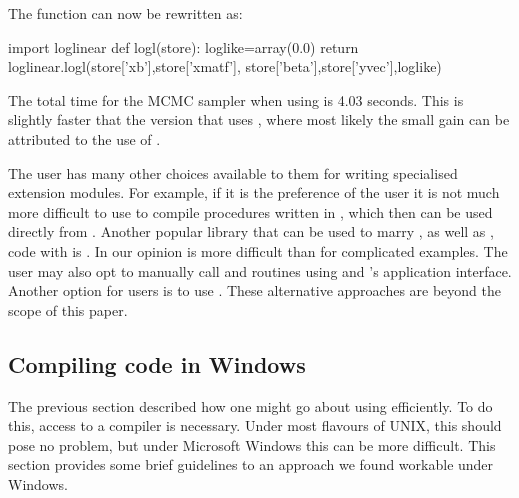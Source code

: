 \documentclass[article]{jss}
\begin{document}
The function  can now be rewritten as:

\begin{Code}
import loglinear
def logl(store):
	loglike=array(0.0)     
	return loglinear.logl(store['xb'],store['xmatf'], 
                  store['beta'],store['yvec'],loglike)
\end{Code}

The total time for the MCMC sampler when using  is 4.03 seconds.
This is slightly faster that the version that uses , where most
likely the small gain can be attributed to the use of .

The user has many other choices available to them for writing
specialised extension modules. For example, if it is the preference of
the user it is not much more difficult to use  to compile
procedures written in , which then can be used directly
from . Another popular library that can be used to
marry , as well as , code with
 is . In our opinion  is more
difficult than  for complicated examples. The user may also
opt to manually call  and  routines using
 and 's  application
interface. Another option for  users is to use
 . These alternative approaches are beyond
the scope of this paper.


\subsection{Compiling code in Windows}
\label{CompilingWindows}

The previous section described how one might go about using
 efficiently. To do this, access to a compiler is
necessary. Under most flavours of UNIX, this should pose no problem,
but under Microsoft Windows this can be more difficult. This section
provides some brief guidelines to an approach we found workable under
Windows.
\end{document}

